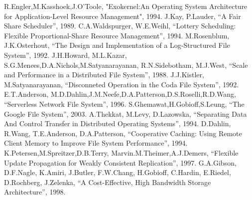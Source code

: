 {\begin{thebibliography}{9}
   R.Engler,M.Kasshoek,J.O'Toole, "Exokernel:An Operating System Architecture for Application-Level Resource Management", 1994.
	 J.Kay, P.Lauder, ``A Fair Share Scheduler'', 1989.
	 C.A.Waldspurger, W.E.Weihl, ``Lottery Scheduling: Flexible Proportional-Share Resource Management'', 1994.
	 M.Rosenblum, J.K.Osterhout, ``The Design and Implementation of a Log-Structured File System'', 1992.
	 J.H.Howard, M.L.Kazar, S.G.Menees,D.A.Nichols,M.Satyanarayanan, R.N.Sidebotham, M.J.West, ``Scale and Performance in a Distributed File System'', 1988.
	 J.J.Kistler, M.Satyanarayanan, ``Disconneted Operation in the Coda File System'', 1992.
	 E.T.Anderson, M.D.Dahlin,J.M.Neefe,D.A.Patterson,D.S.Roselli,R.D.Wang, ``Serverless Network File System'', 1996.
	 S.Ghemawat,H.Gobioff,S.Leung, ``The Google File System'', 2003.
	 A.Thekkat, M.Levy, D.Lazowska, ``Separating Data And Control Transfer in Distributed Operating Systems'', 1994.
	 D.Dahlin, R.Wang, T.E.Anderson, D.A.Patterson, ``Cooperative Caching: Using Remote Client Memory to Improve File System Performance'', 1994.
	 K.Petersen,M.Spreitzer,D.B.Terry, Marvin.M.Theimer,A.J.Demers, ``Flexible Update Propagation for Weakly Consistent Replication'', 1997.
	 G.A.Gibson, D.F.Nagle, K.Amiri, J.Butler, F.W.Chang, H.Gobioff, C.Hardin, E.Riedel, D.Rochberg, J.Zelenka, ``A Cost-Effective, High Bandwidth Storage Architecture'', 1998.
\end{thebibliography}
}

